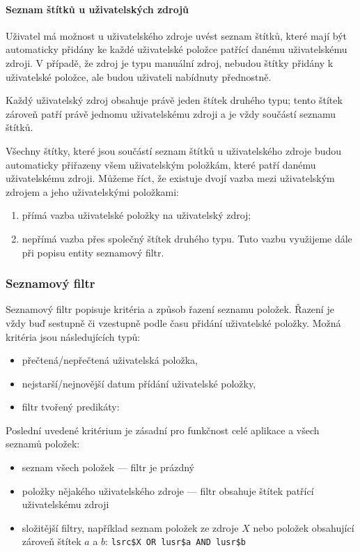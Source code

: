 \paragraph{Seznam štítků u uživatelských zdrojů}
Uživatel má možnost u uživatelského zdroje uvést seznam štítků, které mají být automaticky přidány ke každé uživatelské položce patřící danému uživatelskému zdroji.
V případě, že zdroj je typu manuální zdroj, nebudou štítky přidány k uživatelské položce, ale budou uživateli nabídnuty přednostně.

Každý uživatelský zdroj obsahuje právě jeden štítek druhého typu; tento štítek zároveň patří právě jednomu uživatelskému zdroji a je vždy součástí seznamu štítků.

Všechny štítky, které jsou součástí seznam štítků u uživatelského zdroje budou automaticky přiřazeny všem uživatelským položkám, které patří danému uživatelskému zdroji.
Můžeme říct, že existuje dvojí vazba mezi uživatelským zdrojem a jeho uživatelskými položkami:
\begin{enumerate}
	\item přímá vazba uživatelské položky na uživatelský zdroj;
	\item nepřímá vazba přes společný štítek druhého typu.
		Tuto vazbu využijeme dále při popisu entity seznamový filtr.
\end{enumerate}

\subsubsection{Seznamový filtr}

Seznamový filtr popisuje kritéria a způsob řazení seznamu položek.
Řazení je vždy buď sestupně či vzestupně podle času přidání uživatelské položky.
Možná kritéria jsou následujících typů:
\begin{itemize}
	\item přečtená/nepřečtená uživatelská položka,
	\item nejstarší/nejnovější datum přídání uživatelské položky,
	\item filtr tvořený predikáty: 
\end{itemize}

Poslední uvedené kritérium je zásadní pro funkčnost celé aplikace a všech seznamů položek:
\begin{itemize}
	\item seznam všech položek --- filtr je prázdný
	\item položky nějakého uživatelského zdroje --- filtr obsahuje štítek patřící uživatelskému zdroji
	\item složitější filtry, například seznam položek ze zdroje $X$ nebo položek obsahující zároveň štítek $a$ a $b$:
		\verb~lsrc$X OR lusr$a AND lusr$b~
\end{itemize}

